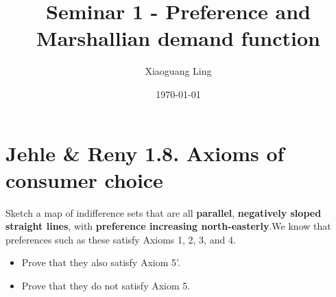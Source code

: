 \documentclass{article}
\title{Seminar 1 - Preference and Marshallian demand function}
\author{Xiaoguang Ling }
\date{\today}
\begin{document}
\maketitle


\section{Jehle \& Reny 1.8. Axioms of consumer choice}

Sketch a map of indifference sets that are all \textbf{parallel}, \textbf{negatively sloped 
straight lines}, with \textbf{preference increasing north-easterly}.We know that preferences 
such as these satisfy Axioms 1, 2, 3, and 4. 
\begin{itemize}
\item Prove that they also satisfy Axiom 5'. 
\item Prove that they do not satisfy Axiom 5.
\end{itemize}
\end{document}
